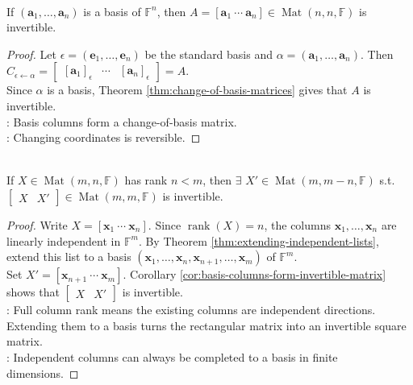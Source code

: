 \begin{corollary} \label{cor:basis-columns-form-invertible-matrix} \\
If $(\mathbf{a}_1,\ldots,\mathbf{a}_n)$ is a basis of $\mathbb{F}^n$, then $A=[\mathbf{a}_1\ \cdots\ \mathbf{a}_n]\in\operatorname{Mat}(n,n,\mathbb{F})$ is invertible.
\begin{proof}
Let $\epsilon=(\mathbf{e}_1,\ldots,\mathbf{e}_n)$ be the standard basis and $\alpha=(\mathbf{a}_1,\ldots,\mathbf{a}_n)$. Then
$C_{\epsilon \leftarrow \alpha} =
\begin{bmatrix}
[\mathbf{a}_1]_{\epsilon} & \cdots & [\mathbf{a}_n]_{\epsilon}
\end{bmatrix} =A$.\\
Since $\alpha$ is a basis, Theorem \ref{thm:change-of-basis-matrices} gives that $A$ is invertible.\\
: Basis columns form a change-of-basis matrix.\\
: Changing coordinates is reversible.
\end{proof}
\end{corollary}

\begin{theorem} \label{thm:complete-full-column-rank-matrix} \\
If $X\in\operatorname{Mat}(m,n,\mathbb{F})$ has rank $n<m$, then $\exists$ $X'\in\operatorname{Mat}(m,m-n,\mathbb{F})$ s.t. $\begin{bmatrix}X & X'\end{bmatrix}\in\operatorname{Mat}(m,m,\mathbb{F})$ is invertible.
\begin{proof}
Write $X=[\mathbf{x}_1\ \cdots\ \mathbf{x}_n]$. Since $\operatorname{rank}(X)=n$, the columns $\mathbf{x}_1,\ldots,\mathbf{x}_n$ are linearly independent in $\mathbb{F}^m$. By Theorem \ref{thm:extending-independent-lists}, extend this list to a basis $(\mathbf{x}_1,\ldots,\mathbf{x}_n,\mathbf{x}_{n+1},\ldots,\mathbf{x}_m)$ of $\mathbb{F}^m$.\\
Set $X'=[\mathbf{x}_{n+1}\ \cdots\ \mathbf{x}_m]$. Corollary \ref{cor:basis-columns-form-invertible-matrix} shows that $\begin{bmatrix}X & X'\end{bmatrix}$ is invertible.\\
: Full column rank means the existing columns are independent directions. Extending them to a basis turns the rectangular matrix into an invertible square matrix.\\
: Independent columns can always be completed to a basis in finite dimensions.
\end{proof}
\end{theorem}

